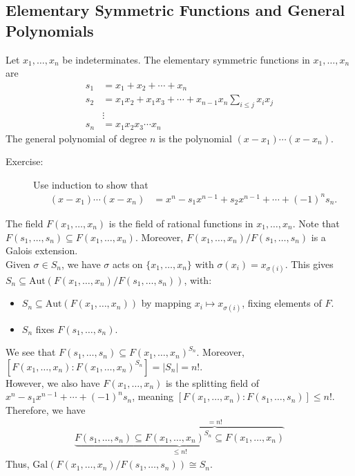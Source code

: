 \documentclass[10pt]{extarticle}
\begin{document}
  \subsection{Elementary Symmetric Functions and General Polynomials}%
  Let $x_1,\dots,x_n$ be indeterminates. The elementary symmetric functions in $x_1,\dots,x_n$ are
  \begin{align*}
    s_1 &= x_1 + x_2 + \cdots + x_n\\
    s_2 &= x_1x_2 + x_1x_3 + \cdots + x_{n-1}x_n \sum_{i\leq j}x_ix_j\\
        &\vdots\\
    s_n &= x_1x_2x_3\cdots x_n
  \end{align*}
  The general polynomial of degree $n$ is the polynomial $(x-x_1)\cdots (x-x_n)$.
  \begin{description}
    \item[Exercise:] Use induction to show that 
      \begin{align*}
        (x-x_1)\cdots(x-x_n) &= x^n - s_1x^{n-1} + s_2x^{n-1} + \cdots + (-1)^ns_n.
      \end{align*}
  \end{description}
  The field $F(x_1,\dots,x_n)$ is the field of rational functions in $x_1,\dots,x_n$. Note that $F(s_1,\dots,s_n)\subseteq F(x_1,\dots,x_n)$. Moreover, $F(x_1,\dots,x_n)/F(s_1,\dots,s_n)$ is a Galois extension.\\

  Given $\sigma \in S_n$, we have $\sigma$ acts on $\{x_1,\dots,x_n\}$ with $\sigma(x_i) = x_{\sigma(i)}$. This gives $S_n\subseteq \text{Aut}\left(F(x_1,\dots,x_n)/F(s_1,\dots,s_n)\right)$, with:
  \begin{itemize}
    \item $S_n\subseteq \text{Aut}\left(F(x_1,\dots,x_n)\right)$ by mapping $x_i \mapsto x_{\sigma(i)}$, fixing elements of $F$.
    \item $S_n$ fixes $F(s_1,\dots,s_n)$.
  \end{itemize}
  We see that $F(s_1,\dots,s_n)\subseteq F(x_1,\dots,x_n)^{S_n}$. Moreover, $[F(x_1,\dots,x_n):F(x_1,\dots,x_n)^{S_n}] = |S_n| = n!$.\\

  However, we also have $F(x_1,\dots,x_n)$ is the splitting field of $x^n - s_1x^{n-1} + \cdots + (-1)^ns_n$, meaning $[F(x_1,\dots,x_n):F(s_1,\dots,s_n)]\leq n!$. Therefore, we have
  \begin{align*}
    \underbrace{F(s_1,\dots,s_n) \subseteq \overbrace{F(x_1,\dots,x_n)^{S_n}\subseteq F(x_1,\dots,x_n)}^{=n!}}_{\leq n!}
  \end{align*}
  Thus, $\text{Gal}(F(x_1,\dots,x_n)/F(s_1,\dots,s_n)) \cong S_n$.\\
\end{document}
